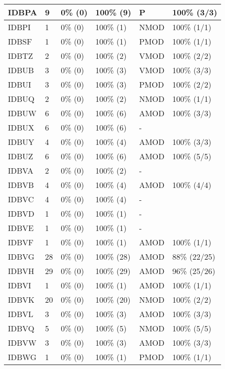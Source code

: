 \begin{figure*}
\begin{tabular}{|l|l|l|l||l|l|}
\hline
 IDBPA & 9 & 0\% (0) & 100\% (9) & P & 100\% (3/3) \\ 
\hline
 IDBPI & 1 & 0\% (0) & 100\% (1) & NMOD & 100\% (1/1) \\ 
\hline
 IDBSF & 1 & 0\% (0) & 100\% (1) & PMOD & 100\% (1/1) \\ 
\hline
 IDBTZ & 2 & 0\% (0) & 100\% (2) & VMOD & 100\% (2/2) \\ 
\hline
 IDBUB & 3 & 0\% (0) & 100\% (3) & VMOD & 100\% (3/3) \\ 
\hline
 IDBUI & 3 & 0\% (0) & 100\% (3) & PMOD & 100\% (2/2) \\ 
\hline
 IDBUQ & 2 & 0\% (0) & 100\% (2) & NMOD & 100\% (1/1) \\ 
\hline
 IDBUW & 6 & 0\% (0) & 100\% (6) & AMOD & 100\% (3/3) \\ 
\hline
 IDBUX & 6 & 0\% (0) & 100\% (6) & - &  \\ 
\hline
 IDBUY & 4 & 0\% (0) & 100\% (4) & AMOD & 100\% (3/3) \\ 
\hline
 IDBUZ & 6 & 0\% (0) & 100\% (6) & AMOD & 100\% (5/5) \\ 
\hline
 IDBVA & 2 & 0\% (0) & 100\% (2) & - &  \\ 
\hline
 IDBVB & 4 & 0\% (0) & 100\% (4) & AMOD & 100\% (4/4) \\ 
\hline
 IDBVC & 4 & 0\% (0) & 100\% (4) & - &  \\ 
\hline
 IDBVD & 1 & 0\% (0) & 100\% (1) & - &  \\ 
\hline
 IDBVE & 1 & 0\% (0) & 100\% (1) & - &  \\ 
\hline
 IDBVF & 1 & 0\% (0) & 100\% (1) & AMOD & 100\% (1/1) \\ 
\hline
 IDBVG & 28 & 0\% (0) & 100\% (28) & AMOD & 88\% (22/25) \\ 
\hline
 IDBVH & 29 & 0\% (0) & 100\% (29) & AMOD & 96\% (25/26) \\ 
\hline
 IDBVI & 1 & 0\% (0) & 100\% (1) & AMOD & 100\% (1/1) \\ 
\hline
 IDBVK & 20 & 0\% (0) & 100\% (20) & NMOD & 100\% (2/2) \\ 
\hline
 IDBVL & 3 & 0\% (0) & 100\% (3) & AMOD & 100\% (3/3) \\ 
\hline
 IDBVQ & 5 & 0\% (0) & 100\% (5) & NMOD & 100\% (5/5) \\ 
\hline
 IDBVW & 3 & 0\% (0) & 100\% (3) & AMOD & 100\% (3/3) \\ 
\hline
 IDBWG & 1 & 0\% (0) & 100\% (1) & PMOD & 100\% (1/1) \\ 
\hline
\end{tabular}
\end{figure*}
